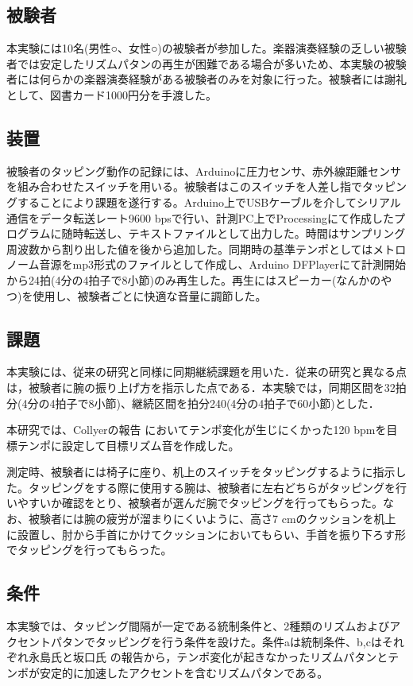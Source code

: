 \documentclass[twocolumn,10pt]{jarticle}
\begin{document}
\subsection{被験者}
本実験には10名(男性○、女性○)の被験者が参加した。楽器演奏経験の乏しい被験者では安定したリズムパタンの再生が困難である場合が多いため、本実験の被験者には何らかの楽器演奏経験がある被験者のみを対象に行った。被験者には謝礼として、図書カード1000円分を手渡した。

\subsection{装置}
被験者のタッピング動作の記録には、Arduinoに圧力センサ、赤外線距離センサを組み合わせたスイッチを用いる。被験者はこのスイッチを人差し指でタッピングすることにより課題を遂行する。Arduino上でUSBケーブルを介してシリアル通信をデータ転送レート9600 bpsで行い、計測PC上でProcessingにて作成したプログラムに随時転送し、テキストファイルとして出力した。時間はサンプリング周波数から割り出した値を後から追加した。同期時の基準テンポとしてはメトロノーム音源をmp3形式のファイルとして作成し、Arduino DFPlayerにて計測開始から24拍(4分の4拍子で8小節)のみ再生した。再生にはスピーカー(なんかのやつ)を使用し、被験者ごとに快適な音量に調節した。

\subsection{課題}
本実験には、従来の研究と同様に同期継続課題を用いた．従来の研究と異なる点は，被験者に腕の振り上げ方を指示した点である．本実験では，同期区間を32拍分(4分の4拍子で8小節)、継続区間を拍分240(4分の4拍子で60小節)とした．

本研究では、Collyerの報告 \cite{Collyer}においてテンポ変化が生じにくかった120 bpmを目標テンポに設定して目標リズム音を作成した。

測定時、被験者には椅子に座り、机上のスイッチをタッピングするように指示した。タッピングをする際に使用する腕は、被験者に左右どちらがタッピングを行いやすいか確認をとり、被験者が選んだ腕でタッピングを行ってもらった。なお、被験者には腕の疲労が溜まりにくいように、高さ7 cmのクッションを机上に設置し、肘から手首にかけてクッションにおいてもらい、手首を振り下ろす形でタッピングを行ってもらった。

\subsection{条件}
本実験では、タッピング間隔が一定である統制条件と、2種類のリズムおよびアクセントパタンでタッピングを行う条件を設けた。条件aは統制条件、b,cはそれぞれ永島氏と坂口氏 \cite{Nagasima}の報告から，テンポ変化が起きなかったリズムパタンとテンポが安定的に加速したアクセントを含むリズムパタンである。
\end{document}
